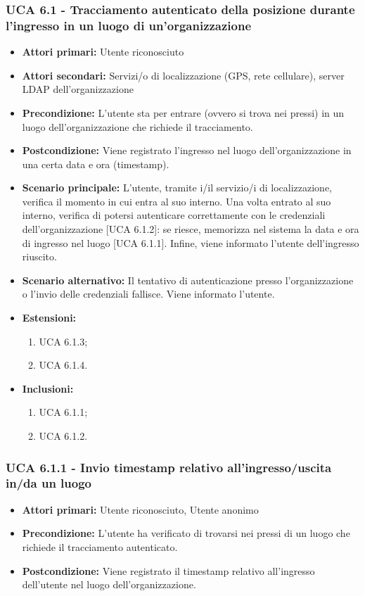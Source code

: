 \subsubsection{UCA 6.1 - Tracciamento autenticato della posizione durante l'ingresso in un luogo di un'organizzazione}
\begin{itemize}
	\item \textbf{Attori primari:} Utente riconosciuto
	\item \textbf{Attori secondari:} Servizi/o di localizzazione (GPS, rete cellulare), server LDAP dell'organizzazione
	\item \textbf{Precondizione:} L'utente sta per entrare (ovvero si trova nei pressi) in un luogo dell'organizzazione che richiede il tracciamento.
	\item \textbf{Postcondizione:} Viene registrato l'ingresso nel luogo dell'organizzazione in una certa data e ora (timestamp).
	\item \textbf{Scenario principale:} L'utente, tramite i/il servizio/i di localizzazione, verifica il momento in cui entra al suo interno. Una volta entrato al suo interno, verifica di potersi autenticare correttamente con le credenziali dell'organizzazione [UCA 6.1.2]: se riesce, memorizza nel sistema la data e ora di ingresso nel luogo [UCA 6.1.1]. Infine, viene informato l'utente dell'ingresso riuscito.
	\item \textbf{Scenario alternativo:} Il tentativo di autenticazione presso l'organizzazione o l'invio delle credenziali fallisce. Viene informato l'utente.
	\item \textbf{Estensioni:}
	\begin{enumerate}
		\item UCA 6.1.3;
		\item UCA 6.1.4.
	\end{enumerate}
	\item \textbf{Inclusioni:}
	\begin{enumerate}
		\item UCA 6.1.1;
		\item UCA 6.1.2.
	\end{enumerate}
\end{itemize}

\subsubsection{UCA 6.1.1 - Invio timestamp relativo all'ingresso/uscita in/da un luogo}
\begin{itemize}
	\item \textbf{Attori primari:} Utente riconosciuto, Utente anonimo
	\item \textbf{Precondizione:} L'utente ha verificato di trovarsi nei pressi di un luogo che richiede il tracciamento autenticato.
	\item \textbf{Postcondizione:} Viene registrato il timestamp relativo all'ingresso dell'utente nel luogo dell'organizzazione.
\end{itemize}

